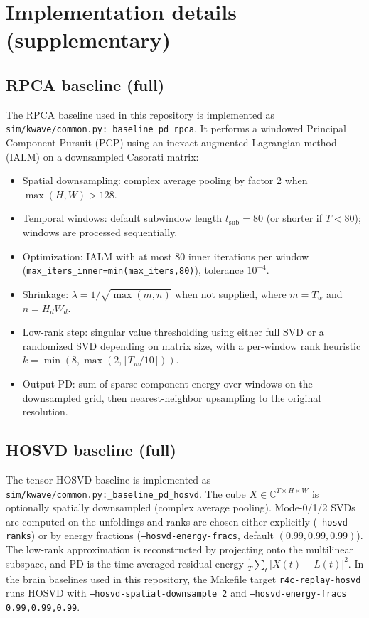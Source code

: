 \documentclass[11pt]{article}
\DeclareRobustCommand{\path}[1]{\nolinkurl{#1}}
\begin{document}
\section{Implementation details (supplementary)}
\label{app:impl-details}

\subsection{RPCA baseline (full)}
The RPCA baseline used in this repository is implemented as \path{sim/kwave/common.py:_baseline_pd_rpca}. It performs a windowed Principal Component Pursuit (PCP) using an inexact augmented Lagrangian method (IALM) on a downsampled Casorati matrix:
\begin{itemize}[nosep]
  \item Spatial downsampling: complex average pooling by factor 2 when $\max(H,W)>128$.
  \item Temporal windows: default subwindow length $t_{\mathrm{sub}}=80$ (or shorter if $T<80$); windows are processed sequentially.
  \item Optimization: IALM with at most 80 inner iterations per window (\path{max_iters_inner=min(max_iters,80)}), tolerance $10^{-4}$.
  \item Shrinkage: $\lambda = 1/\sqrt{\max(m,n)}$ when not supplied, where $m=T_w$ and $n=H_dW_d$.
  \item Low-rank step: singular value thresholding using either full SVD or a randomized SVD depending on matrix size, with a per-window rank heuristic $k=\min(8,\max(2,\lfloor T_w/10\rfloor))$.
  \item Output PD: sum of sparse-component energy over windows on the downsampled grid, then nearest-neighbor upsampling to the original resolution.
\end{itemize}

\subsection{HOSVD baseline (full)}
The tensor HOSVD baseline is implemented as \path{sim/kwave/common.py:_baseline_pd_hosvd}. The cube $X\in\mathbb{C}^{T\times H\times W}$ is optionally spatially downsampled (complex average pooling). Mode-0/1/2 SVDs are computed on the unfoldings and ranks are chosen either explicitly (\texttt{--hosvd-ranks}) or by energy fractions (\texttt{--hosvd-energy-fracs}, default $(0.99,0.99,0.99)$). The low-rank approximation is reconstructed by projecting onto the multilinear subspace, and PD is the time-averaged residual energy $\frac{1}{T}\sum_t |X(t)-L(t)|^2$. In the brain baselines used in this repository, the Makefile target \texttt{r4c-replay-hosvd} runs HOSVD with \texttt{--hosvd-spatial-downsample 2} and \texttt{--hosvd-energy-fracs 0.99,0.99,0.99}.
\end{document}
